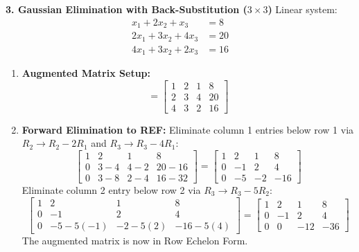 \textbf{3. Gaussian Elimination with Back-Substitution ($3 \times 3$)}
Linear system:
\begin{align*}
x_1 + 2x_2 + x_3 &= 8 \\
2x_1 + 3x_2 + 4x_3 &= 20 \\
4x_1 + 3x_2 + 2x_3 &= 16
\end{align*}
\begin{enumerate}
    \item \textbf{Augmented Matrix Setup:}
    \begin{equation*}
    [A \mid \mathbf{b}] = \left[\begin{array}{ccc|c}
    1 & 2 & 1 & 8 \\
    2 & 3 & 4 & 20 \\
    4 & 3 & 2 & 16
    \end{array}\right]
    \end{equation*}
    \item \textbf{Forward Elimination to REF:}
    Eliminate column 1 entries below row 1 via $R_2 \to R_2 - 2R_1$ and $R_3 \to R_3 - 4R_1$:
    \begin{equation*}
    \left[\begin{array}{ccc|c}
    1 & 2 & 1 & 8 \\
    0 & 3 - 4 & 4 - 2 & 20 - 16 \\
    0 & 3 - 8 & 2 - 4 & 16 - 32
    \end{array}\right]
    = \left[\begin{array}{ccc|c}
    1 & 2 & 1 & 8 \\
    0 & -1 & 2 & 4 \\
    0 & -5 & -2 & -16
    \end{array}\right]
    \end{equation*}
    Eliminate column 2 entry below row 2 via $R_3 \to R_3 - 5R_2$:
    \begin{equation*}
    \left[\begin{array}{ccc|c}
    1 & 2 & 1 & 8 \\
    0 & -1 & 2 & 4 \\
    0 & -5 - 5(-1) & -2 - 5(2) & -16 - 5(4)
    \end{array}\right]
    = \left[\begin{array}{ccc|c}
    1 & 2 & 1 & 8 \\
    0 & -1 & 2 & 4 \\
    0 & 0 & -12 & -36
    \end{array}\right]
    \end{equation*}
    The augmented matrix is now in Row Echelon Form.

\end{enumerate}
